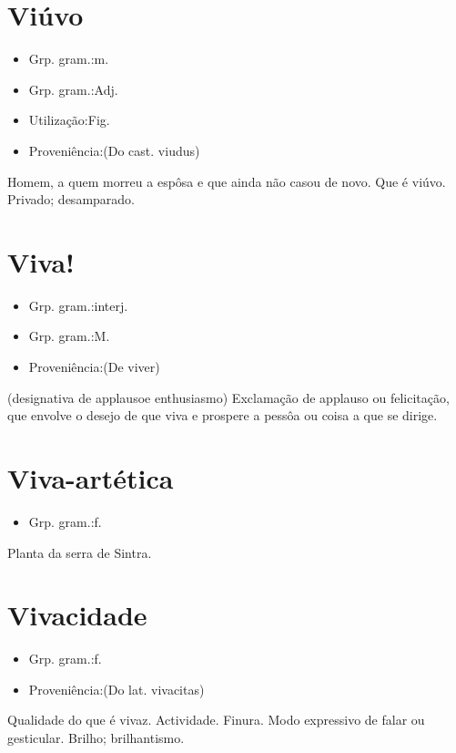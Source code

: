 \documentclass{article}
\begin{document}
\section{Viúvo}
\begin{itemize}
\item {Grp. gram.:m.}
\end{itemize}
\begin{itemize}
\item {Grp. gram.:Adj.}
\end{itemize}
\begin{itemize}
\item {Utilização:Fig.}
\end{itemize}
\begin{itemize}
\item {Proveniência:(Do cast. \textunderscore viudus\textunderscore )}
\end{itemize}
Homem, a quem morreu a espôsa e que ainda não casou de novo.
Que é viúvo.
Privado; desamparado.
\section{Viva!}
\begin{itemize}
\item {Grp. gram.:interj.}
\end{itemize}
\begin{itemize}
\item {Grp. gram.:M.}
\end{itemize}
\begin{itemize}
\item {Proveniência:(De \textunderscore viver\textunderscore )}
\end{itemize}
(designativa de \textunderscore applauso\textunderscore  e \textunderscore enthusiasmo\textunderscore )
Exclamação de applauso ou felicitação, que envolve o desejo de que viva e prospere a pessôa ou coisa a que se dirige.
\section{Viva-artética}
\begin{itemize}
\item {Grp. gram.:f.}
\end{itemize}
Planta da serra de Sintra.
\section{Vivacidade}
\begin{itemize}
\item {Grp. gram.:f.}
\end{itemize}
\begin{itemize}
\item {Proveniência:(Do lat. \textunderscore vivacitas\textunderscore )}
\end{itemize}
Qualidade do que é vivaz.
Actividade.
Finura.
Modo expressivo de falar ou gesticular.
Brilho; brilhantismo.
\end{document}
